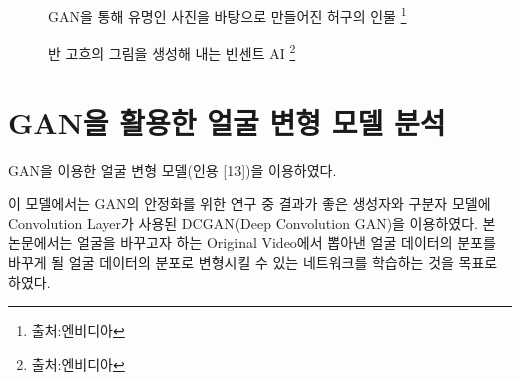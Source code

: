 \begin{figure}[h!]
\centering
\caption{GAN을 통해 유명인 사진을 바탕으로 만들어진 허구의 인물 \protect\footnote{출처:엔비디아}}
\end{figure}


\begin{figure}[h!]
\centering
\caption{반 고흐의 그림을 생성해 내는 빈센트 AI \protect\footnote{출처:엔비디아}}
\end{figure}


\section{ GAN을 활용한 얼굴 변형 모델 분석}

GAN을 이용한 얼굴 변형 모델(인용 [13])을 이용하였다.

이 모델에서는 GAN의 안정화를 위한 연구 중 결과가 좋은 생성자와 구분자 모델에 Convolution Layer가 사용된 DCGAN(Deep Convolution GAN)을 이용하였다. 본 논문에서는 얼굴을 바꾸고자 하는 Original Video에서 뽑아낸 얼굴 데이터의 분포를 바꾸게 될 얼굴 데이터의 분포로 변형시킬 수 있는 네트워크를 학습하는 것을 목표로 하였다.

